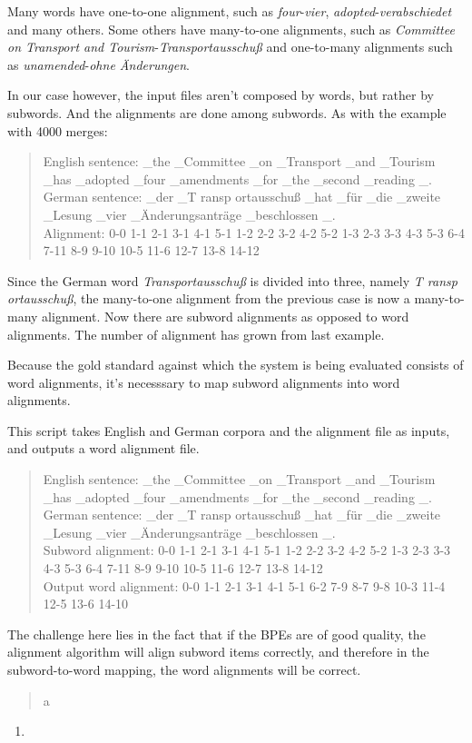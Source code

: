 Many words have one-to-one alignment, such as \emph{four}-\emph{vier}, \emph{adopted}-\emph{verabschiedet} and many others. Some others have many-to-one alignments, such as \emph{Committee on Transport and Tourism}-\emph{Transportausschuß} and one-to-many alignments such as \emph{unamended}-\emph{ohne Änderungen}.

In our case however, the input files aren't composed by words, but rather by subwords. And the alignments are done among subwords. As with the example with 4000 merges:

\begin{quote}
	English sentence: \_the \_Committee \_on \_Transport \_and \_Tourism \_has \_adopted \_four \_amendments \_for \_the \_second \_reading \_.\\
	German sentence: \_der \_T ransp ortausschuß \_hat \_für \_die \_zweite \_Lesung \_vier \_Änderungsanträge \_beschlossen \_.\\
	Alignment: 0-0 1-1 2-1 3-1 4-1 5-1 1-2 2-2 3-2 4-2 5-2 1-3 2-3 3-3 4-3 5-3 6-4 7-11 8-9 9-10 10-5 11-6 12-7 13-8 14-12
\end{quote}

Since the German word \emph{Transportausschuß} is divided into three, namely \emph{T ransp ortausschuß}, the many-to-one alignment from the previous case is now a many-to-many alignment. Now there are subword alignments as opposed to word alignments. The number of alignment has grown from last example.

Because the gold standard against which the system is being evaluated consists of word alignments, it's necesssary to map subword alignments into word alignments.

This script takes English and German corpora and the alignment file as inputs, and outputs a word alignment file.

\begin{quote}
	English sentence: \_the \_Committee \_on \_Transport \_and \_Tourism \_has \_adopted \_four \_amendments \_for \_the \_second \_reading \_.\\
	German sentence: \_der \_T ransp ortausschuß \_hat \_für \_die \_zweite \_Lesung \_vier \_Änderungsanträge \_beschlossen \_.\\
	Subword alignment: 0-0 1-1 2-1 3-1 4-1 5-1 1-2 2-2 3-2 4-2 5-2 1-3 2-3 3-3 4-3 5-3 6-4 7-11 8-9 9-10 10-5 11-6 12-7 13-8 14-12\\
	Output word alignment: 0-0 1-1 2-1 3-1 4-1 5-1 6-2 7-9 8-7 9-8 10-3 11-4 12-5 13-6 14-10
\end{quote}

The challenge here lies in the fact that if the BPEs are of good quality, the alignment algorithm will align subword items correctly, and therefore in the subword-to-word mapping, the word alignments will be correct.

\begin{quote}
	a\\
\end{quote}

\begin{enumerate}
	\item 
\end{enumerate}